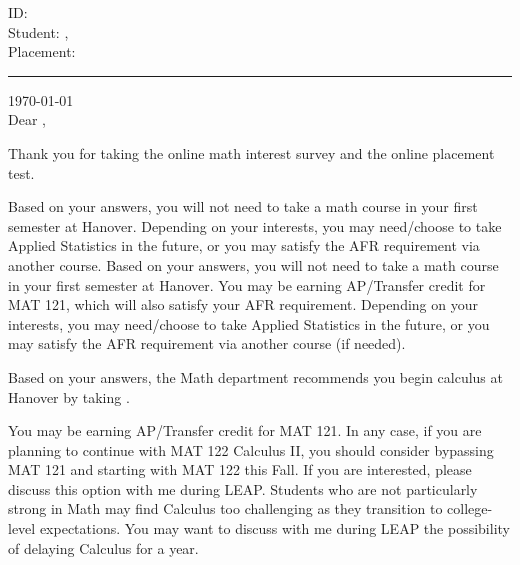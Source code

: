 \documentclass[12pt]{article}
\begin{document}
	\newpage
	{\noindent\Large ID: \\
	Student: ,  \\
	Placement: 
	}
	\vspace{0.2in}
	\hrule
	\vspace{0.5in}
	\noindent\today\\
  
	\vspace{0.2in}
	\noindent Dear ,
	\vspace{0.2in}

		Thank you for taking the online math interest survey and the online placement test.

		    Based on your answers, you will not need to take a math course in your first semester at Hanover. Depending on your interests, you may need/choose to take Applied Statistics in the future, or you may satisfy the AFR requirement via another course. 
		    Based on your answers, you will not need to take a math course in your first semester at Hanover. You may be earning AP/Transfer credit for MAT 121, which will also satisfy your AFR requirement. Depending on your interests, you may need/choose to take Applied Statistics in the future, or you may satisfy the AFR requirement via another course (if needed).
	  
	  
      Based on your answers, the Math department recommends you begin calculus at Hanover by taking .


      You may be earning AP/Transfer credit for MAT 121. In any case, if you are planning to continue with MAT 122 Calculus II, you should consider bypassing MAT 121 and starting with MAT 122 this Fall. If you are interested, please discuss this option with me during LEAP.
      		Students who are not particularly strong in Math may find Calculus too challenging as they transition to college-level expectations. You may want to discuss with me during LEAP the possibility of delaying Calculus for a year.
\end{document}
